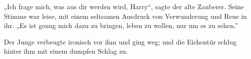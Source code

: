 „Ich frage mich, was aus dir werden wird, Harry“, sagte der alte Zauberer. Seine Stimme war leise, mit einem seltsamen Ausdruck von Verwunderung und Reue in ihr. „Es ist genug mich dazu zu bringen, leben zu wollen, nur um es zu sehen.”

Der Junge verbeugte ironisch vor ihm und ging weg; und die Eichentür schlug hinter ihm mit einem dumpfen Schlag zu.

